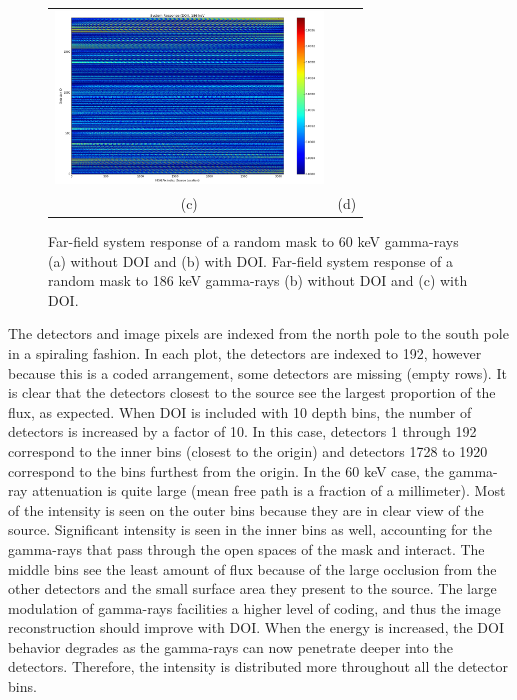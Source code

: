 \documentclass[10pt]{article}
\begin{document}
\begin{figure}[htb!]
\begin{tabular}{cc}
	\includegraphics[height=130pt]{Figures/SystemResponse_186_DOI.png} \\ [-0.5ex]
	\scriptsize{(c)} & \scriptsize{(d)} \\[-5pt]
\end{tabular}
\caption{Far-field system response of a random mask to 60 keV gamma-rays (a) without DOI and (b) with DOI. Far-field system response of a random mask to 186 keV gamma-rays (b) without DOI and (c) with DOI.}
\end{figure}

The detectors and image pixels are indexed from the north pole to the south pole in a spiraling fashion. In each plot, the detectors are indexed to 192, however because this is a coded arrangement, some detectors are missing (empty rows). It is clear that the detectors closest to the source see the largest proportion of the flux, as expected. When DOI is included with 10 depth bins, the number of detectors is increased by a factor of 10. In this case, detectors 1 through 192 correspond to the inner bins (closest to the origin) and detectors 1728 to 1920 correspond to the bins furthest from the origin. In the 60 keV case, the gamma-ray attenuation is quite large (mean free path is a fraction of a millimeter). Most of the intensity is seen on the outer bins because they are in clear view of the source. Significant intensity is seen in the inner bins as well, accounting for the gamma-rays that pass through the open spaces of the mask and interact. The middle bins see the least amount of flux because of the large occlusion from the other detectors and the small surface area they present to the source. The large modulation of gamma-rays facilities a higher level of coding, and thus the image reconstruction should improve with DOI. When the energy is increased, the DOI behavior degrades as the gamma-rays can now penetrate deeper into the detectors. Therefore, the intensity is distributed more throughout all the detector bins.
\end{document}
